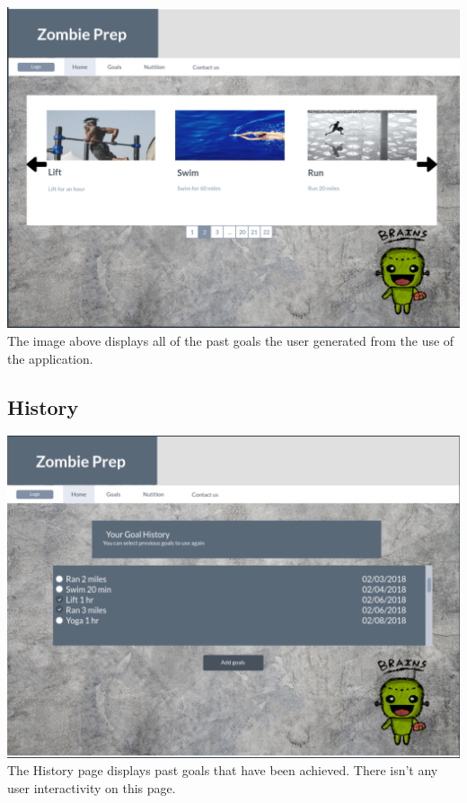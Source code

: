 \documentclass[a4paper]{article}
\begin{document}
\pagebreak
\includegraphics[width=\textwidth]{Goals2.PNG}
The image above displays all of the past goals the user generated from the use of the application. 
\pagebreak
\subsection{History}
\includegraphics[width=\textwidth]{History.PNG}
The History page displays past goals that have been achieved. There isn't any user interactivity on this page.

\pagebreak
\end{document}
